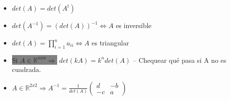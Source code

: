 \begin{enumerate}
\begin{itemize}
        \item $det(A) = det(A^t)$
        \item $det(A^{-1}) = (det(A))^{-1} \iff A$ es inversible
        \item $det(A) = \prod_{i=1}^{n}a_{ii} \iff A$ es triangular 
        \item \colorbox{Gray}{Si $A \in \mathbb{R}^{nxn} \Rightarrow$} $det(kA) = k^ndet(A)$ -- Chequear qué pasa si A no es cuadrada.
        \item $A \in \mathbb{R}^{2x2} \Rightarrow A^{-1} = \frac{1}{det(A)} \begin{pmatrix}
                        d & -b\\
                        -c & a
                        \end{pmatrix}$
    \end{itemize}
\end{enumerate}

